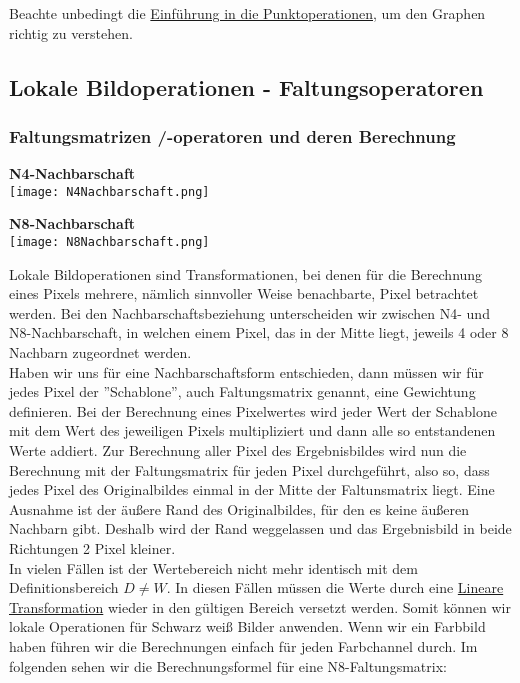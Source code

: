Beachte unbedingt die \hyperref[sec:Punktoperationen]{Einführung in die Punktoperationen}, um den Graphen richtig zu verstehen.

\subsection{Lokale Bildoperationen - Faltungsoperatoren}

\subsubsection{Faltungsmatrizen /-operatoren und deren Berechnung}
\label{sec:faltungsoperatoren}

\textbf{N4-Nachbarschaft}\\

\texttt{[image: N4Nachbarschaft.png]}

\textbf{N8-Nachbarschaft}\\

\texttt{[image: N8Nachbarschaft.png]}

Lokale Bildoperationen sind Transformationen, bei denen für die Berechnung eines Pixels mehrere, nämlich sinnvoller Weise benachbarte, Pixel betrachtet werden. Bei den Nachbarschaftsbeziehung unterscheiden wir zwischen N4- und N8-Nachbarschaft, in welchen einem Pixel, das in der Mitte liegt, jeweils 4 oder 8 Nachbarn zugeordnet werden.\\
Haben wir uns für eine Nachbarschaftsform entschieden, dann müssen wir für jedes Pixel der ''Schablone'', auch Faltungsmatrix genannt, eine Gewichtung definieren. Bei der Berechnung eines Pixelwertes wird jeder Wert der Schablone mit dem Wert des jeweiligen Pixels multipliziert und dann alle so entstandenen Werte addiert. Zur Berechnung aller Pixel des Ergebnisbildes wird nun die Berechnung mit der Faltungsmatrix für jeden Pixel durchgeführt, also so, dass jedes Pixel des Originalbildes einmal in der Mitte der Faltunsmatrix liegt. Eine Ausnahme ist der äußere Rand des Originalbildes, für den es keine äußeren Nachbarn gibt. Deshalb wird der Rand weggelassen und das Ergebnisbild in beide Richtungen 2 Pixel kleiner.\\
In vielen Fällen ist der Wertebereich nicht mehr identisch mit dem Definitionsbereich $D \neq W$. In diesen Fällen müssen die Werte durch eine \hyperref[sec:Punktoperationen]{Lineare Transformation} wieder in den gültigen Bereich versetzt werden. Somit können wir lokale Operationen für Schwarz weiß Bilder anwenden. Wenn wir ein Farbbild haben führen wir die Berechnungen einfach für jeden Farbchannel durch. Im folgenden sehen wir die Berechnungsformel für eine N8-Faltungsmatrix:

